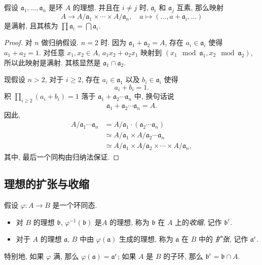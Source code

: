 \begin{theorem}[中国剩余定理]
  假设 \( \mathfrak{a}_1, \ldots, \mathfrak{a}_n \) 是环 \( A \) 的理想. 并且在
  \( i \neq j \) 时,  \( \mathfrak{a}_i \) 和 \( \mathfrak{a}_j \) 互素,
  那么映射
  \[
    A \to A / \mathfrak{a}_1 \times \cdots \times A / \mathfrak{a}_n,\quad a
    \mapsto (\ldots, a + \mathfrak{a}_i, \ldots)
  \]
  是满射, 且其核为 \( \prod \mathfrak{a}_i = \bigcap \mathfrak{a}_i \).
\end{theorem}
\begin{proof}
  对 \( n \) 做归纳假设.
  \( n = 2 \) 时.
  因为 \( \mathfrak{a}_1 + \mathfrak{a}_2 = A \), 存在 \( a_i \in \mathfrak{a}_i
  \) 使得 \( a_1 + a_2 = 1 \).
  对任意 \( x_1, x_2 \in A \), \( a_1 x_2 + a_2 x_1 \) 映射到 \( (x_1
  \mod{\mathfrak{a}_1}, x_2 \mod{\mathfrak{a}_2}) \), 所以此映射是满射.
  其核显然是 \( \mathfrak{a}_1 \cap \mathfrak{a}_2 \).

  现假设 \( n > 2 \), 对于 \( i \geq 2 \), 存在 \( a_i \in \mathfrak{a}_1 \)
  以及 \( b_i \in \mathfrak{a}_i \) 使得
  \[
    a_i + b_i = 1.
  \]
  积 \( \prod_{i \geq 2}(a_i + b_i) = 1 \) 落于 \( \mathfrak{a}_1 +
  \mathfrak{a}_2 \cdots \mathfrak{a}_n \) 中, 换句话说
  \[
    \mathfrak{a}_1 + \mathfrak{a}_2\cdots \mathfrak{a}_n = A.
  \]
  因此,
  \begin{align*}
    A / \mathfrak{a}_1 \cdots \mathfrak{a}_n &= A / \mathfrak{a}_1 \cdot
    (\mathfrak{a}_2 \cdots \mathfrak{a}_n)\\ &\simeq A / \mathfrak{a}_1 \times A
    / \mathfrak{a}_2 \cdots \mathfrak{a}_n\\ &\simeq A/ \mathfrak{a}_1 \times A
    / \mathfrak{a}_2 \times \cdots \times A / \mathfrak{a}_n,
  \end{align*}
  其中, 最后一个同构由归纳法保证.
\end{proof}


\subsection{理想的扩张与收缩}

假设 \( \varphi: A \to B \) 是一个环同态.
\begin{itemize}
  \item 对 \( B \) 的理想 \( \mathfrak{b} \), \( \varphi^{-1}(\mathfrak{b}) \)
    是\( A \) 的理想, 称为 \( \mathfrak{b} \) 在 \( A \) 上的\emph{收缩},
    记作 \( \mathfrak{b}^{c} \).
  \item 对于 \( A \) 的理想 \( \mathfrak{a} \), \( B \) 中由 \(
    \varphi(\mathfrak{a}) \) 生成的理想, 称为 \( \mathfrak{a} \) 在 \( B \) 中的
    \emph{扩张}, 记作 \( \mathfrak{a}^{e} \).
\end{itemize}
特别地, 如果 \( \varphi \) 满, 那么 \( \varphi(\mathfrak{a}) = \mathfrak{a}^e \);
如果 \( A \) 是 \( B \) 的子环, 那么 \( \mathfrak{b}^{c} = \mathfrak{b} \cap A
\).


